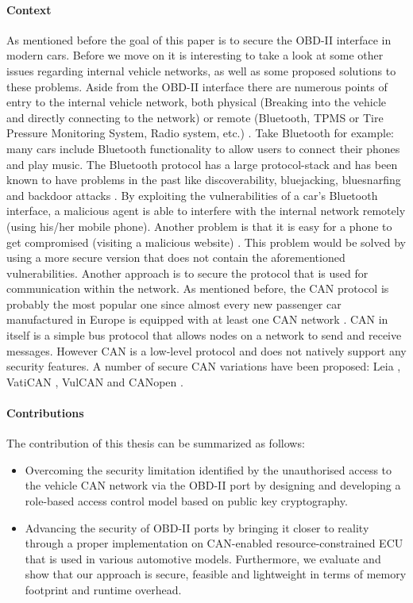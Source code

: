 \documentclass[11pt]{article}
\begin{document}
\paragraph{Context}
As mentioned before the goal of this paper is to secure the OBD-II interface in modern cars. Before we move on it is interesting to take a look at some other issues regarding internal vehicle networks, as well as some proposed solutions to these problems. Aside from the OBD-II interface there are numerous points of entry to the internal vehicle network, both physical (Breaking into the vehicle and directly connecting to the network) or remote (Bluetooth, TPMS or Tire Pressure Monitoring System, Radio system, etc.) \cite{MillerA}. Take Bluetooth for example: many cars include Bluetooth functionality to allow users to connect their phones and play music. The Bluetooth protocol has a large protocol-stack and has been known to have problems in the past \cite{MillerA} like discoverability, bluejacking, bluesnarfing and backdoor attacks \cite{Bluetooth}. By exploiting the vulnerabilities of a car's Bluetooth interface, a malicious agent is able to interfere with the internal network remotely (using his/her mobile phone). Another problem is that it is easy for a phone to get compromised (visiting a malicious website) \cite{Yadav16}. This problem would be solved by using a more secure version that does not contain the aforementioned vulnerabilities.\newline 
\newline
Another approach is to secure the protocol that is used for communication within the network. As mentioned before, the CAN protocol is probably the most popular one since almost every new passenger car manufactured in Europe is equipped with at least one CAN network \cite{CANhistory}. CAN in itself is a simple bus protocol that allows nodes on a network to send and receive messages. However CAN is a low-level protocol and does not natively support any security features. A number of secure CAN variations have been proposed: Leia \cite{Leia}, VatiCAN \cite{VatiCAN}, VulCAN \cite{VulCAN} and CANopen \cite{Pfeiffer}.

\paragraph{Contributions}
The contribution of this thesis can be summarized as follows:

\begin{itemize}
	\item Overcoming the security limitation identified by the unauthorised access to the vehicle CAN network via the OBD-II port by designing and developing a role-based access control model based on public key cryptography.
	
	\item Advancing the security of OBD-II ports by bringing it closer to reality through a proper implementation on CAN-enabled resource-constrained ECU that is used in various automotive models. Furthermore, we evaluate and show that our approach is secure, feasible and lightweight in terms of memory footprint and runtime overhead.
\end{itemize}   
\end{document}
